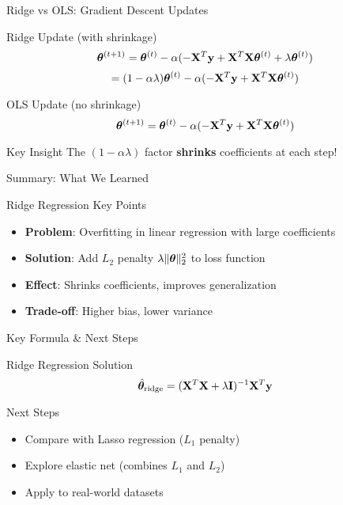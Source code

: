 \documentclass{beamer}
\begin{document}
\begin{frame}{Ridge vs OLS: Gradient Descent Updates}
\begin{theorembox}{Ridge Update (with shrinkage)}
$$\boldsymbol{\theta}^{(t+1)} = \boldsymbol{\theta}^{(t)} - \alpha(-\mathbf{X}^T\mathbf{y} + \mathbf{X}^T\mathbf{X}\boldsymbol{\theta}^{(t)} + \lambda\boldsymbol{\theta}^{(t)})$$
$$= (1 - \alpha\lambda)\boldsymbol{\theta}^{(t)} - \alpha(-\mathbf{X}^T\mathbf{y} + \mathbf{X}^T\mathbf{X}\boldsymbol{\theta}^{(t)})$$
\end{theorembox}
\pause

\begin{theorembox}{OLS Update (no shrinkage)}
$$\boldsymbol{\theta}^{(t+1)} = \boldsymbol{\theta}^{(t)} - \alpha(-\mathbf{X}^T\mathbf{y} + \mathbf{X}^T\mathbf{X}\boldsymbol{\theta}^{(t)})$$
\end{theorembox}
\pause

\begin{keypointsbox}{Key Insight}
The $(1 - \alpha\lambda)$ factor \textbf{shrinks} coefficients at each step!
\end{keypointsbox}
\end{frame}

\begin{frame}{Summary: What We Learned}
\begin{keypointsbox}{Ridge Regression Key Points}
\begin{itemize}
\item \textbf{Problem}: Overfitting in linear regression with large coefficients
\item \textbf{Solution}: Add $L_2$ penalty $\lambda\|\boldsymbol{\theta}\|_2^2$ to loss function
\item \textbf{Effect}: Shrinks coefficients, improves generalization
\item \textbf{Trade-off}: Higher bias, lower variance
\end{itemize}
\end{keypointsbox}
\end{frame}

\begin{frame}{Key Formula \& Next Steps}
\begin{theorembox}{Ridge Regression Solution}
$$\hat{\boldsymbol{\theta}}_{\text{ridge}} = (\mathbf{X}^T\mathbf{X} + \lambda\mathbf{I})^{-1}\mathbf{X}^T\mathbf{y}$$
\end{theorembox}
\pause

\begin{alertbox}{Next Steps}
\begin{itemize}
\item Compare with Lasso regression ($L_1$ penalty)
\item Explore elastic net (combines $L_1$ and $L_2$)
\item Apply to real-world datasets
\end{itemize}
\end{alertbox}
\end{frame}
\end{document}
